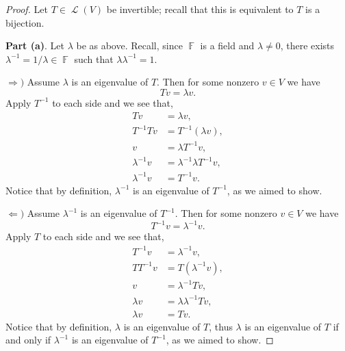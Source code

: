\documentclass[letterpaper, 12pt]{amsart}
\DeclareMathOperator{\F}{\mathbb{F}}				%
\DeclareMathOperator{\Ell}{\mathscr{L}}				%
\theoremstyle{definition}  							%
\newcommand{\Ra}{\Rightarrow}                   %
\newcommand{\La}{\Leftarrow}                    %
\begin{document}
		\begin{proof}
		Let $T \in \Ell(V)$ be invertible; recall that this is equivalent to $T$ is a bijection.

		\textbf{Part (a)}.
		Let $\lambda$ be as above.
		Recall, since $\F$ is a field and $\lambda \neq 0$, there exists $\lambda^{-1} = 1/\lambda \in \F$ such that $\lambda\lambda^{-1}=1$.

		$\Ra)$ Assume $\lambda$ is an eigenvalue of $T$.
		Then for some nonzero $v \in V$ we have $$Tv = \lambda v.$$
		Apply $T^{-1}$ to each side and we see that,
		\begin{align*}
			Tv &= \lambda v, \\
			T^{-1}Tv &= T^{-1}(\lambda v), \\
			v &= \lambda T^{-1}v, \\
			\lambda^{-1}v &= \lambda^{-1}\lambda T^{-1}v, \\
			\lambda^{-1}v &= T^{-1}v.
		\end{align*}
		Notice that by definition, $\lambda^{-1}$ is an eigenvalue of $T^{-1}$, as we aimed to show.

		$\La)$ Assume $\lambda^{-1}$ is an eigenvalue of $T^{-1}$.
		Then for some nonzero $v \in V$ we have $$T^{-1}v = \lambda^{-1} v.$$
		Apply $T$ to each side and we see that,
		\begin{align*}
			T^{-1}v &= \lambda^{-1} v, \\
			TT^{-1}v &= T(\lambda^{-1} v), \\
			v &= \lambda^{-1} Tv, \\
			\lambda v &= \lambda\lambda^{-1} Tv, \\
			\lambda v &= Tv.
		\end{align*}
		Notice that by definition, $\lambda$ is an eigenvalue of $T$, thus $\lambda$ is an eigenvalue of $T$ if and only if $\lambda^{-1}$ is an eigenvalue of $T^{-1}$, as we aimed to show.


\end{proof}
\end{document}
